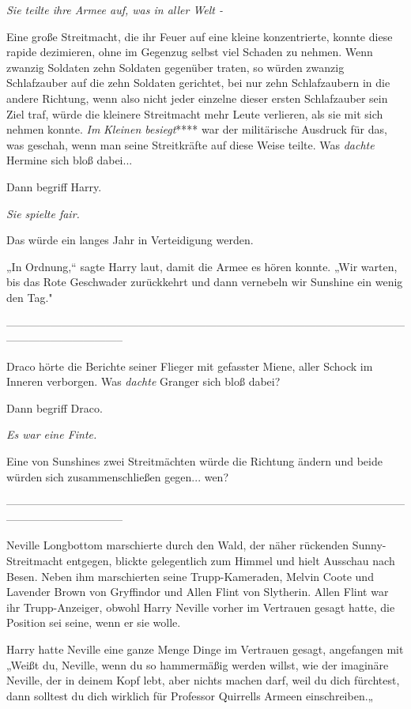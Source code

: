 {\emph{Sie teilte ihre Armee auf, was in aller Welt -}

Eine große Streitmacht, die ihr Feuer auf eine kleine konzentrierte, konnte diese rapide dezimieren, ohne im Gegenzug selbst viel Schaden zu nehmen. Wenn zwanzig Soldaten zehn Soldaten gegenüber traten, so würden zwanzig Schlafzauber auf die zehn Soldaten gerichtet, bei nur zehn Schlafzaubern in die andere Richtung, wenn also nicht jeder einzelne dieser ersten Schlafzauber sein Ziel traf, würde die kleinere Streitmacht mehr Leute verlieren, als sie mit sich nehmen konnte. \emph{Im} \emph{Kleinen besiegt}**** war der militärische Ausdruck für das, was geschah, wenn man seine Streitkräfte auf diese Weise teilte. Was \emph{dachte} Hermine sich bloß dabei...

Dann begriff Harry.

\emph{Sie spielte fair.}

Das würde ein langes Jahr in Verteidigung werden.

„In Ordnung,“ sagte Harry laut, damit die Armee es hören konnte. „Wir warten, bis das Rote Geschwader zurückkehrt und dann vernebeln wir Sunshine ein wenig den Tag."

--------------------------------------------------------------------------------------------------------------------------------------------

\hfill\break Draco hörte die Berichte seiner Flieger mit gefasster Miene, aller Schock im Inneren verborgen. Was \emph{dachte} Granger sich bloß dabei?

Dann begriff Draco.

\emph{Es war eine Finte.}

Eine von Sunshines zwei Streitmächten würde die Richtung ändern und beide würden sich zusammenschließen gegen... wen?

--------------------------------------------------------------------------------------------------------------------------------------------

\hfill\break Neville Longbottom marschierte durch den Wald, der näher rückenden Sunny-Streitmacht entgegen, blickte gelegentlich zum Himmel und hielt Ausschau nach Besen. Neben ihm marschierten seine Trupp-Kameraden, Melvin Coote und Lavender Brown von Gryffindor und Allen Flint von Slytherin. Allen Flint war ihr Trupp-Anzeiger, obwohl Harry Neville vorher im Vertrauen gesagt hatte, die Position sei seine, wenn er sie wolle.

Harry hatte Neville eine ganze Menge Dinge im Vertrauen gesagt, angefangen mit „Weißt du, Neville, wenn du so hammermäßig werden willst, wie der imaginäre Neville, der in deinem Kopf lebt, aber nichts machen darf, weil du dich fürchtest, dann solltest du dich wirklich für Professor Quirrells Armeen einschreiben.„

}
